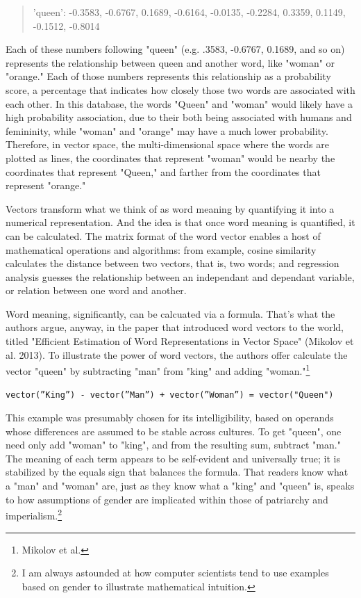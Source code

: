 \documentclass[11pt]{article}
\begin{document}
\begin{enumerate}
\begin{quote}
'queen': -0.3583, -0.6767, 0.1689, -0.6164, -0.0135, -0.2284, 0.3359,
        0.1149, -0.1512, -0.8014
\end{quote}

Each of these numbers following "queen" (e.g. .3583, -0.6767, 0.1689,
and so on) represents the relationship between queen and another word,
like "woman" or "orange." Each of those numbers represents this
relationship as a probability score, a percentage that indicates how
closely those two words are associated with each other. In this
database, the words "Queen" and "woman" would likely have a high
probability association, due to their both being associated with
humans and femininity, while "woman" and "orange" may have a much
lower probability. Therefore, in vector space, the multi-dimensional
space where the words are plotted as lines, the coordinates that
represent "woman" would be nearby the coordinates that represent
"Queen," and farther from the coordinates that represent "orange."

Vectors transform what we think of as word meaning by quantifying it
into a numerical representation. And the idea is that once word
meaning is quantified, it can be calculated. The matrix format of the
word vector enables a host of mathematical operations and algorithms:
from example, cosine similarity calculates the distance between two
vectors, that is, two words; and regression analysis guesses the
relationship between an independant and dependant variable, or
relation between one word and another.

Word meaning, significantly, can be calcuated via a formula. That's
what the authors argue, anyway, in the paper that introduced word
vectors to the world, titled "Efficient Estimation of Word
Representations in Vector Space" (Mikolov et al. 2013). To illustrate
the power of word vectors, the authors offer calculate the vector
"queen" by subtracting "man" from "king" and adding "woman."\footnote{Mikolov et al.}

\begin{verbatim}
vector(”King”) - vector(”Man”) + vector(”Woman”) = vector("Queen")
\end{verbatim}

This example was presumably chosen for its intelligibility, based on
operands whose differences are assumed to be stable across cultures.
To get "queen", one need only add "woman" to "king", and from the
resulting sum, subtract "man." The meaning of each term appears to be
self-evident and universally true; it is stabilized by the equals sign
that balances the formula. That readers know what a "man" and "woman"
are, just as they know what a "king" and "queen" is, speaks to how
assumptions of gender are implicated within those of patriarchy and
imperialism.\footnote{I am always astounded at how computer scientists tend to use
examples based on gender to illustrate mathematical intuition.}


\end{enumerate}
\end{document}
